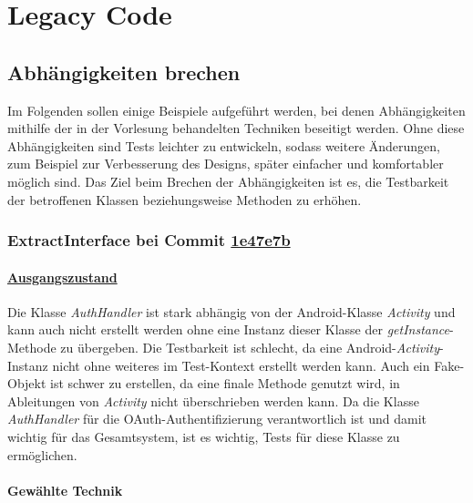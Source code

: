 \chapter{Legacy Code}
\label{ch:Legacy_Code}

\section{Abhängigkeiten brechen}

Im Folgenden sollen einige Beispiele aufgeführt werden, bei denen Abhängigkeiten mithilfe der in der Vorlesung behandelten Techniken beseitigt werden.
Ohne diese Abhängigkeiten sind Tests leichter zu entwickeln, sodass weitere Änderungen, zum Beispiel zur Verbesserung des Designs, später einfacher und komfortabler möglich sind.
Das Ziel beim Brechen der Abhängigkeiten ist es, die Testbarkeit der betroffenen Klassen beziehungsweise Methoden zu erhöhen.

\newpage

\subsection{ExtractInterface bei Commit \href{https://github.com/lukaspanni/OpenSourceStats/commit/1e47e7b2d42c04429a433a6ac3dbea781409d36d} {1e47e7b}}
\label{sec:ExtractInterface_AuthHandler_1}

\subsubsection*{\href{https://github.com/lukaspanni/OpenSourceStats/tree/0daf8862a81a976e3d6341f5b5461bc8d3c64b4f/app/src/main/java/de/lukaspanni/opensourcestats/auth/}{Ausgangszustand}}

Die Klasse \textit{AuthHandler} ist stark abhängig von der Android-Klasse \textit{Activity} und kann auch nicht erstellt werden ohne eine Instanz dieser Klasse der \textit{getInstance}-Methode zu übergeben.
Die Testbarkeit ist schlecht, da eine Android-\textit{Activity}-Instanz nicht ohne weiteres im Test-Kontext erstellt werden kann.
Auch ein Fake-Objekt ist schwer zu erstellen, da eine finale Methode genutzt wird, in Ableitungen von \textit{Activity} nicht überschrieben werden kann.
Da die Klasse \textit{AuthHandler} für die OAuth-Authentifizierung verantwortlich ist und damit wichtig für das Gesamtsystem, ist es wichtig, Tests für diese Klasse zu ermöglichen.

\subsubsection*{Gewählte Technik}

